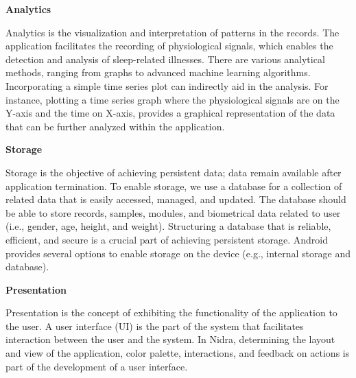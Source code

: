 \noindent \textbf{Analytics}

\noindent Analytics is the visualization and interpretation of patterns in the records. The application facilitates the recording of physiological signals, which enables the detection and analysis of sleep-related illnesses. There are various analytical methods, ranging from graphs to advanced machine learning algorithms. Incorporating a simple time series plot can indirectly aid in the analysis. For instance, plotting a time series graph where the physiological signals are on the Y-axis and the time on X-axis, provides a graphical representation of the data that can be further analyzed within the application.

\noindent \textbf{Storage}

\noindent Storage is the objective of achieving persistent data; data remain available after application termination. To enable storage, we use a database for a collection of related data that is easily accessed, managed, and updated. The database should be able to store records, samples, modules, and biometrical data related to user (i.e., gender, age, height, and weight). Structuring a database that is reliable, efficient, and secure is a crucial part of achieving persistent storage. Android provides several options to enable storage on the device (e.g., internal storage and database).

\noindent \textbf{Presentation}

\noindent Presentation is the concept of exhibiting the functionality of the application to the user. A user interface (UI) is the part of the system that facilitates interaction between the user and the system. In Nidra, determining the layout and view of the application, color palette, interactions, and feedback on actions is part of the development of a user interface. 